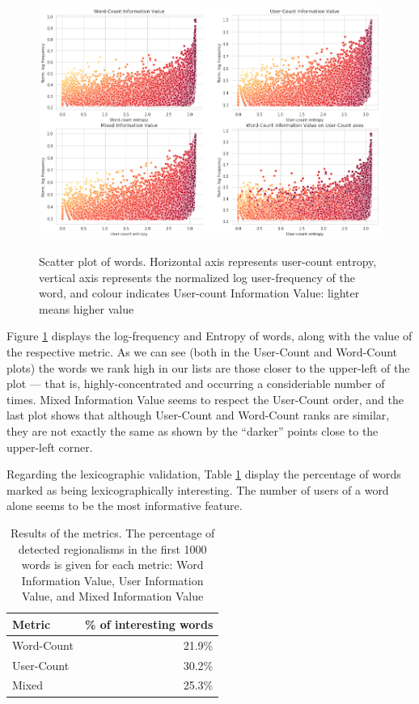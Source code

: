 

\begin{figure}[t]
   \includegraphics[width=\textwidth]{./images/entropy_log_rank.png}
   \label{fig:ivalue}
   \caption{Scatter plot of words. Horizontal axis represents user-count entropy, vertical axis represents the normalized log user-frequency of the word, and colour indicates User-count Information Value: lighter means higher value}
\end{figure}



Figure \ref{fig:ivalue} displays the log-frequency and Entropy of words, along with the value of the respective metric. As we can see (both in the User-Count and Word-Count plots) the words we rank high in our lists are those closer to the upper-left of the plot — that is, highly-concentrated and occurring a consideriable number of times. Mixed Information Value seems to respect the User-Count order, and the last plot shows that although User-Count and Word-Count ranks are similar, they are not exactly the same as shown by the ``darker'' points close to the upper-left corner.


Regarding the lexicographic validation, Table \ref{tab:metric_results} display the percentage of words marked as being lexicographically interesting. The number of users of a word alone seems to be the most informative feature. 

\begin{table}[t]
\centering
\begin{tabular}{lr}
Metric                      &  \% of interesting words  \\ %
\hline
Word-Count       &  21.9\%   \\
User-Count       &  30.2\%  \\
Mixed            &  25.3\%  \\ %
\hline
\end{tabular}
\caption{Results of the metrics. The percentage of detected regionalisms in the first 1000 words is given for each metric: Word Information Value, User Information Value, and Mixed Information Value  }
\label{tab:metric_results}
\end{table}


